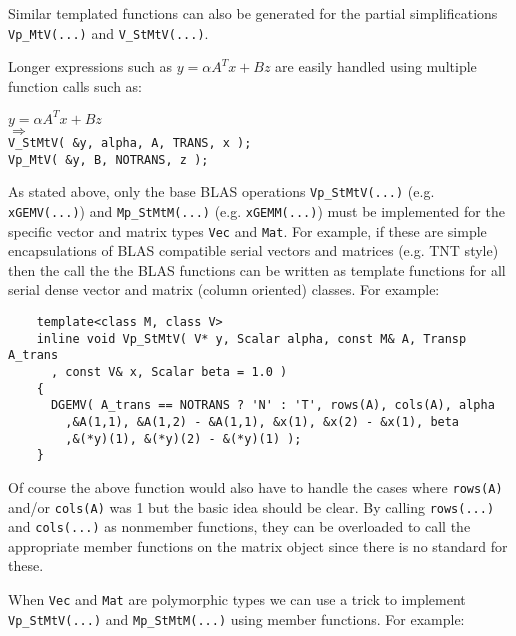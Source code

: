 \documentclass[acmtoms,acmnow]{acmtrans2m}
\begin{document}
Similar templated functions can also be generated for the partial
simplifications {}\texttt{Vp\_MtV(...)} and {}\texttt{V\_StMtV(...)}.

Longer expressions such as $y = \alpha A^T x + B z$ are easily handled using multiple
function calls such as:

{\bsinglespace
\hspace*{4ex}\parbox{\textwidth}{
$y = \alpha A^T x + B z$ \\
$\Longrightarrow$\\
\texttt{V\_StMtV( \&y, alpha, A, TRANS, x );}\\
\texttt{Vp\_MtV( \&y, B, NOTRANS, z );}
}
\esinglespace}

As stated above, only the base BLAS operations {}\texttt{Vp\_StMtV(...)} (e.g.
{}\texttt{xGEMV(...)})
and {}\texttt{Mp\_StMtM(...)} (e.g. {}\texttt{xGEMM(...)}) must be implemented
for the specific vector and matrix types {}\texttt{Vec} and {}\texttt{Mat}.  For
example, if these are simple encapsulations of BLAS compatible serial vectors
and matrices (e.g. TNT style) then the call the the BLAS functions can be
written as template functions for all serial dense vector and matrix (column
oriented) classes.  For example:

{\bsinglespace\small
\begin{minipage}{\textwidth}
\begin{verbatim}
    template<class M, class V>
    inline void Vp_StMtV( V* y, Scalar alpha, const M& A, Transp A_trans
      , const V& x, Scalar beta = 1.0 )
    {
      DGEMV( A_trans == NOTRANS ? 'N' : 'T', rows(A), cols(A), alpha
        ,&A(1,1), &A(1,2) - &A(1,1), &x(1), &x(2) - &x(1), beta
        ,&(*y)(1), &(*y)(2) - &(*y)(1) );
    }
\end{verbatim}
\end{minipage}
\esinglespace}

Of course the above function would also have to handle the cases where
{}\texttt{rows(A)} and/or {}\texttt{cols(A)} was 1 but the basic idea should
be clear.  By calling {}\texttt{rows(...)} and {}\texttt{cols(...)} as
nonmember functions, they can be overloaded to call the appropriate member
functions on the matrix object since there is no standard for these.

When {}\texttt{Vec} and {}\texttt{Mat} are polymorphic types we can use
a trick to implement {}\texttt{Vp\_StMtV(...)} and {}\texttt{Mp\_StMtM(...)}
using member functions.  For example:\\[1ex]
\end{document}
